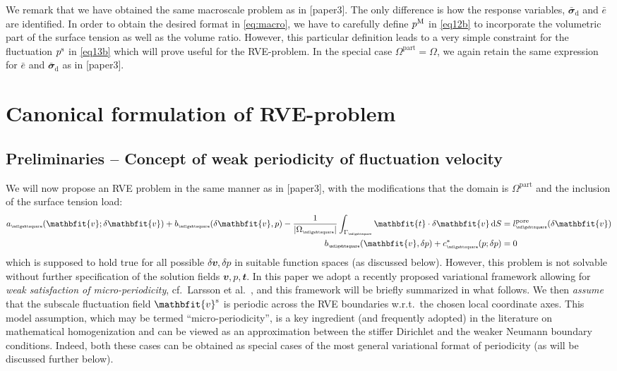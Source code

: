 \documentclass[12pt,a4paper]{article}
\renewcommand{\ta}[1]{\mathbfit{#1}}
\renewcommand{\ts}[1]{\mathbfit{#1}}
\renewcommand{\Box}{\mdlgwhtsquare}
\renewcommand{\dev}{\mathrm{d}}
\newcommand{\volume}{|\Omega_\rve|}
\newcommand{\pore}{\mathrm{pore}}
\newcommand{\particle}{\mathrm{part}}
\newcommand{\rve}{
  {\mathchoice
   {\mbox{\scalebox{0.67}{$\Box$}}}
   {\mbox{\scalebox{0.67}{$\Box$}}}
   {\mbox{\scalebox{0.5}{$\Box$}}}
   {\mbox{\scalebox{0.375}{$\Box$}}}
  }
}
\begin{document}
We remark that we have obtained the same macroscale problem as in [paper3].
The only difference is how the response variables, $\bar{\ts\sigma}_\dev$ and $\bar{e}$ are identified.
In order to obtain the desired format in \eqref{eq:macro}, we have to carefully define $p^{\mathrm{M}}$ in \eqref{eq12b} to incorporate the volumetric part of the surface tension as well as the volume ratio. However, this particular definition leads to a very simple constraint for the fluctuation $p^{\mathrm{s}}$ in \eqref{eq13b} which will prove useful for the RVE-problem.
In the special case $\Omega^\particle = \Omega$, we again retain the same expression for $\bar{e}$ and $\bar{\ts\sigma}_\dev$ as in [paper3].



\section{Canonical formulation of RVE-problem}

\subsection{Preliminaries -- Concept of weak periodicity of fluctuation velocity}

We will now propose an RVE problem in the same manner as in [paper3], with the modifications that the domain is $\Omega^\particle$ and the inclusion of the surface tension load:
\begin{subequations}
\begin{align}
    a_\rve(\ta v;\delta\ta v) + b_\rve(\delta\ta v,p) - \frac{1}{\volume}\int_{\Gamma_\rve} \ta{t}\cdot\delta\ta v \dif S &= l_\rve^\pore(\delta\ta v)
\label{eq19a} \\
    b_\rve(\ta v,\delta p) + c^*_\rve(p;\delta p) &= 0
\label{eq19b}
\end{align}
\end{subequations}
which is supposed to hold true for all possible $\delta\ta v, \delta p$ in suitable function spaces (as discussed below).
However, this problem is not solvable without further specification of the solution fields $\ta v, p, \ta{t}$.
In this paper we adopt a recently proposed variational framework allowing for \emph{weak satisfaction of micro-periodicity}, cf.\  Larsson et al.\ \cite{larsson_computational_2011}, and this framework will be briefly summarized in what follows.
We then \emph{assume} that the subscale fluctuation field $\ta v^\fluct$ is periodic across the RVE boundaries w.r.t.\ the chosen local coordinate axes.
This model assumption, which may be termed ``micro-periodicity'', is a key ingredient (and frequently adopted) in the literature on mathematical homogenization and can be viewed as an approximation between the stiffer Dirichlet and the weaker Neumann boundary conditions.
Indeed, both these cases can be obtained as special cases of the most general variational format of periodicity (as will be discussed further below).
\end{document}
